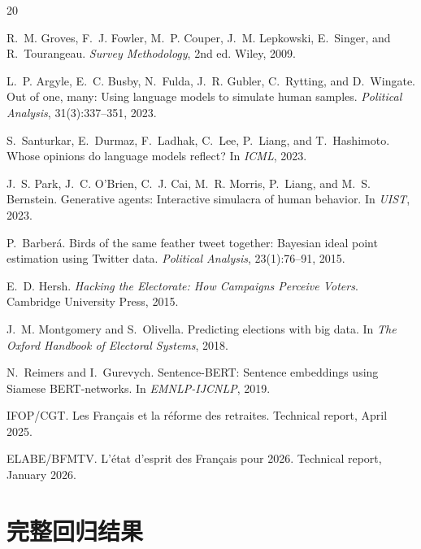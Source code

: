 \documentclass[11pt,a4paper]{ctexart}
\begin{document}
\begin{thebibliography}{20}

R.~M. Groves, F.~J. Fowler, M.~P. Couper, J.~M. Lepkowski, E.~Singer, and R.~Tourangeau.
\newblock \textit{Survey Methodology}, 2nd ed. Wiley, 2009.

L.~P. Argyle, E.~C. Busby, N.~Fulda, J.~R. Gubler, C.~Rytting, and D.~Wingate.
\newblock Out of one, many: Using language models to simulate human samples.
\newblock \textit{Political Analysis}, 31(3):337--351, 2023.

S.~Santurkar, E.~Durmaz, F.~Ladhak, C.~Lee, P.~Liang, and T.~Hashimoto.
\newblock Whose opinions do language models reflect?
\newblock In \textit{ICML}, 2023.

J.~S. Park, J.~C. O'Brien, C.~J. Cai, M.~R. Morris, P.~Liang, and M.~S. Bernstein.
\newblock Generative agents: Interactive simulacra of human behavior.
\newblock In \textit{UIST}, 2023.

P.~Barber\'a.
\newblock Birds of the same feather tweet together: Bayesian ideal point estimation using Twitter data.
\newblock \textit{Political Analysis}, 23(1):76--91, 2015.

E.~D. Hersh.
\newblock \textit{Hacking the Electorate: How Campaigns Perceive Voters}. Cambridge University Press, 2015.

J.~M. Montgomery and S.~Olivella.
\newblock Predicting elections with big data.
\newblock In \textit{The Oxford Handbook of Electoral Systems}, 2018.

N.~Reimers and I.~Gurevych.
\newblock Sentence-BERT: Sentence embeddings using Siamese BERT-networks.
\newblock In \textit{EMNLP-IJCNLP}, 2019.

IFOP/CGT.
\newblock Les Fran\c{c}ais et la r\'eforme des retraites.
\newblock Technical report, April 2025.

ELABE/BFMTV.
\newblock L'\'etat d'esprit des Fran\c{c}ais pour 2026.
\newblock Technical report, January 2026.

\end{thebibliography}

\appendix
\section{完整回归结果}
\end{document}
